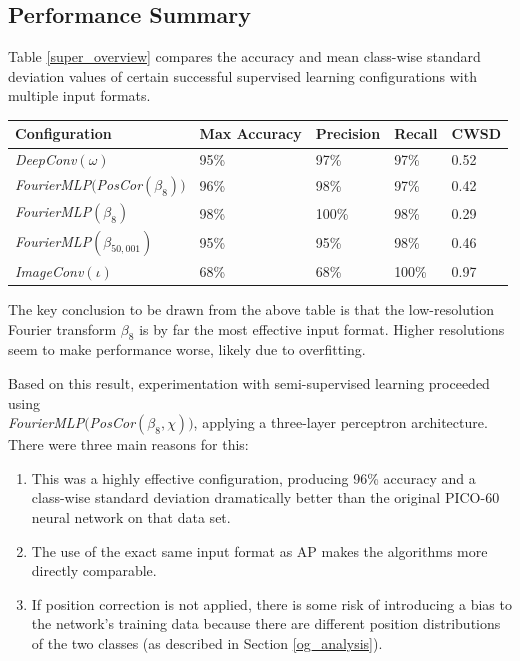 \documentclass[10pt]{article}
\begin{document}
\subsection{Performance Summary}

Table \ref{super_overview} compares the accuracy and mean class-wise standard deviation values of certain successful supervised learning configurations with multiple input formats.

\begin{minipage}{\textwidth}
    \begin{center}
         \label{super_overview}
        \begin{tabular}{|l|l|l|l|l|}
            \hline
            Configuration & Max Accuracy & Precision & Recall & CWSD \\
            \hline
            {\it DeepConv}$(\omega)$ & 95\% & 97\% & 97\% & 0.52 \\
            \hline
            {\it FourierMLP}$(${\it PosCor}$(\beta_{8}))$ & 96\% & 98\% & 97\% & 0.42 \\
            \hline
            {\it FourierMLP}$(\beta_{8})$ & 98\% & 100\% & 98\% & 0.29 \\
            \hline
            {\it FourierMLP}$(\beta_{50,001})$ & 95\% & 95\% & 98\% & 0.46 \\
            \hline
            {\it ImageConv}$(\iota)$ & 68\% & 68\% & 100\% & 0.97 \\
            \hline
        \end{tabular}
    \end{center}
\end{minipage}

The key conclusion to be drawn from the above table is that the low-resolution Fourier transform $\beta_{8}$ is by far the most effective input format. Higher resolutions seem to make performance worse, likely due to overfitting.

Based on this result, experimentation with semi-supervised learning proceeded using \\ {\it FourierMLP}$(${\it PosCor}$(\beta_{8}, \chi))$, applying a three-layer perceptron architecture. There were three main reasons for this:

\begin{enumerate}
    \item This was a highly effective configuration, producing 96\% accuracy and a class-wise standard deviation dramatically better than the original PICO-60 neural network on that data set.
    \item The use of the exact same input format as AP makes the algorithms more directly comparable.
    \item If position correction is not applied, there is some risk of introducing a bias to the network's training data because there are different position distributions of the two classes (as described in Section \ref{og_analysis}).
\end{enumerate}
\end{document}
